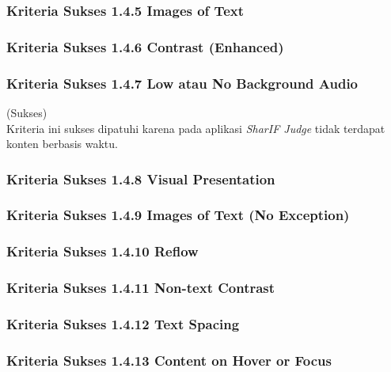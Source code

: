 \subsubsection{Kriteria Sukses 1.4.5 Images of Text}
\label{subsubsec:kepatuhan_kriteria_1.4.5}


\subsubsection{Kriteria Sukses 1.4.6 Contrast (Enhanced)}
\label{subsubsec:kepatuhan_kriteria_1.4.6}


\subsubsection{Kriteria Sukses 1.4.7 Low atau No Background Audio}
\label{subsubsec:kepatuhan_kriteria_1.4.7}
(Sukses) \\

Kriteria ini sukses dipatuhi karena pada aplikasi \textit{SharIF Judge} tidak terdapat konten berbasis waktu.


\subsubsection{Kriteria Sukses 1.4.8 Visual Presentation}
\label{subsubsec:kepatuhan_kriteria_1.4.8}

\subsubsection{Kriteria Sukses 1.4.9 Images of Text (No Exception)}
\label{subsubsec:kepatuhan_kriteria_1.4.9}

\subsubsection{Kriteria Sukses 1.4.10 Reflow}
\label{subsubsec:kepatuhan_kriteria_1.4.10}

\subsubsection{Kriteria Sukses 1.4.11 Non-text Contrast}
\label{subsubsec:kepatuhan_kriteria_1.4.11}

\subsubsection{Kriteria Sukses 1.4.12 Text Spacing}
\label{subsubsec:kepatuhan_kriteria_1.4.12}

\subsubsection{Kriteria Sukses 1.4.13 Content on Hover or Focus}
\label{subsubsec:kepatuhan_kriteria_1.4.13}